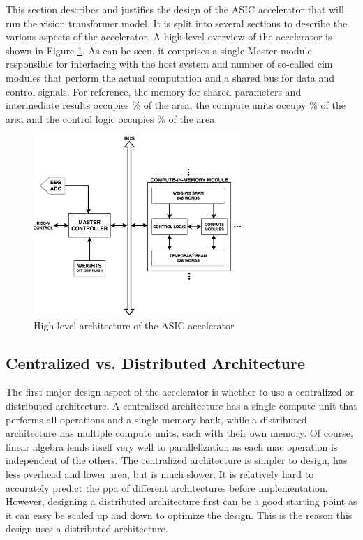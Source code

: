 This section describes and justifies the design of the ASIC accelerator that will run the vision transformer model. It is split into several sections to describe the
various aspects of the accelerator. A high-level overview of the accelerator is shown in Figure \ref{fig:high_level_arch}. As can be seen, it comprises a single Master
module responsible for interfacing with the host system and number of so-called \ac{cim} modules that perform the actual computation and a shared bus for data and control
signals. For reference, the memory for shared parameters and intermediate results occupies \percentmem{}\% of the area, the compute units occupy \percentcompute{}\% of
the area and the control logic occupies \percentlogic{}\% of the area.

\begin{figure}
    \centering
    \includegraphics[width=0.7\textwidth]{assets/High_level_arch.png}
    \caption{High-level architecture of the ASIC accelerator}
    \label{fig:high_level_arch}
\end{figure}

\subsection{Centralized vs. Distributed Architecture}
The first major design aspect of the accelerator is whether to use a centralized or distributed architecture. A centralized architecture has a single compute unit that
performs all operations and a single memory bank, while a distributed architecture has multiple compute units, each with their own memory. Of course, linear algebra lends
itself very well to parallelization as each \ac{mac} operation is independent of the others. The centralized architecture is simpler to design, has less overhead and lower
area, but is much slower. It is relatively hard to accurately predict the \ac{ppa} of different architectures before implementation. However, designing a distributed
architecture first can be a good starting point as it can easy be scaled up and down to optimize the design. This is the reason this design uses a distributed architecture.

